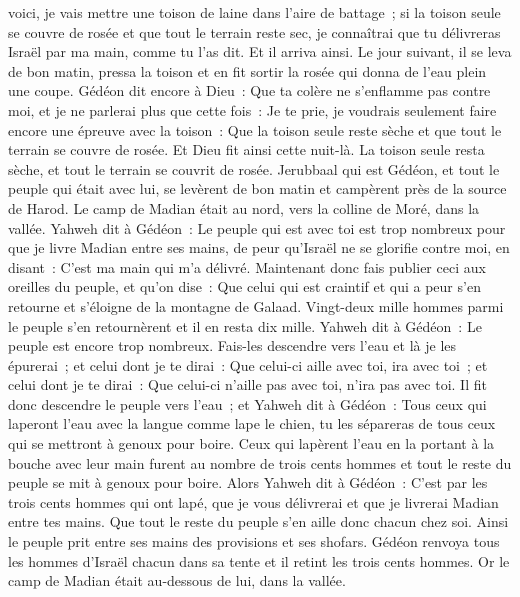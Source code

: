 \begin{multicols}{2}
voici, je vais mettre une toison de laine dans l'aire de battage~; si la toison seule se couvre de rosée et que tout le terrain reste sec, je connaîtrai que tu délivreras Israël par ma main, comme tu l'as dit.
Et il arriva ainsi. Le jour suivant, il se leva de bon matin, pressa la toison et en fit sortir la rosée qui donna de l'eau plein une coupe.
Gédéon dit encore à Dieu~: Que ta colère ne s'enflamme pas contre moi, et je ne parlerai plus que cette fois~: Je te prie, je voudrais seulement faire encore une épreuve avec la toison~: Que la toison seule reste sèche et que tout le terrain se couvre de rosée.
Et Dieu fit ainsi cette nuit-là. La toison seule resta sèche, et tout le terrain se couvrit de rosée.
\VerseOne{}Jerubbaal qui est Gédéon, et tout le peuple qui était avec lui, se levèrent de bon matin et campèrent près de la source de Harod. Le camp de Madian était au nord, vers la colline de Moré, dans la vallée.
Yahweh dit à Gédéon~: Le peuple qui est avec toi est trop nombreux pour que je livre Madian entre ses mains, de peur qu'Israël ne se glorifie contre moi, en disant~: C'est ma main qui m'a délivré.
Maintenant donc fais publier ceci aux oreilles du peuple, et qu'on dise~: Que celui qui est craintif et qui a peur s'en retourne et s'éloigne de la montagne de Galaad. Vingt-deux mille hommes parmi le peuple s'en retournèrent et il en resta dix mille.
Yahweh dit à Gédéon~: Le peuple est encore trop nombreux. Fais-les descendre vers l'eau et là je les épurerai~; et celui dont je te dirai~: Que celui-ci aille avec toi, ira avec toi~; et celui dont je te dirai~: Que celui-ci n'aille pas avec toi, n'ira pas avec toi.
Il fit donc descendre le peuple vers l'eau~; et Yahweh dit à Gédéon~: Tous ceux qui laperont l'eau avec la langue comme lape le chien, tu les sépareras de tous ceux qui se mettront à genoux pour boire.
Ceux qui lapèrent l'eau en la portant à la bouche avec leur main furent au nombre de trois cents hommes et tout le reste du peuple se mit à genoux pour boire.
Alors Yahweh dit à Gédéon~: C'est par les trois cents hommes qui ont lapé, que je vous délivrerai et que je livrerai Madian entre tes mains. Que tout le reste du peuple s'en aille donc chacun chez soi.
Ainsi le peuple prit entre ses mains des provisions et ses shofars. Gédéon renvoya tous les hommes d'Israël chacun dans sa tente et il retint les trois cents hommes. Or le camp de Madian était au-dessous de lui, dans la vallée.

\end{multicols}
